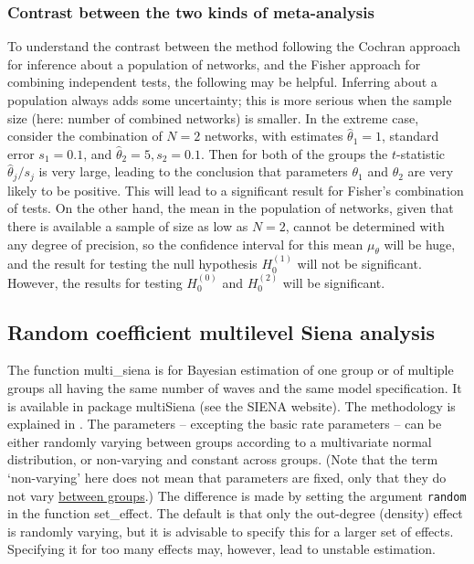 \documentclass[a4paper,fleqn,11pt]{article}
\newcommand{\+}{\, + \,}
\newcommand{\sfn}[1]{\textsf{#1}}
\newcommand{\SI}{{\sf SIENA }}
\newcommand{\MS}{{\sf multiSiena }}
\begin{document}
\subsubsection{Contrast between the two kinds of meta-analysis }

To understand the contrast between the method following the Cochran approach
for inference about a population of networks,
and the Fisher approach for combining independent tests, the following
may be helpful.
Inferring about a population always adds some uncertainty;
this is more serious when the sample size (here: number of combined networks)
is smaller.
In the extreme case, consider the combination of $N=2$ networks,
with estimates $\hat\theta_1 = 1$, standard error $s_1 = 0.1$,
and $\hat\theta_2 = 5, s_2 = 0.1$.
Then for both of the groups the $t$-statistic $\hat\theta_j/s_j$ is very large,
leading to the conclusion that parameters $\theta_1$ and $\theta_2$
are very likely to be positive.
This will lead to a significant result for Fisher's combination of tests.
On the other hand, the mean in the population of networks, given that
there is available a sample of size as low as $N=2$, cannot be determined with
any degree of precision, so the confidence interval for this mean $\mu_\theta$
will be huge, and the result for testing the null hypothesis
$H_0^{(1)}$ will not be significant.
However, the results for testing $H_0^{(0)}$ and $H_0^{(2)}$
will be significant.


\subsection{Random coefficient multilevel Siena analysis}
\label{S_multi_siena}

  The function \textsf{multi\_siena} is for Bayesian estimation of one group or
  of multiple groups all having the same number of waves and the same
  model specification.
  It is available in package \MS (see the \SI website).
  The methodology is explained in \citet{KoskinenSnijders2023}.
  The parameters -- excepting the basic rate parameters -- can be either
  randomly varying between groups according to a multivariate
  normal distribution, or non-varying and constant across groups.
  (Note that the term `non-varying' here does not mean that parameters
  are fixed, only that they do not vary \underline{between groups}.)
  The difference is made by setting the argument \texttt{random} in
  the function \sfn{set\_effect}. The default is that only the out-degree (density)
  effect is randomly varying, but it is advisable to specify
  this for a larger set of effects.
  Specifying it for too many effects may, however, lead to unstable estimation.
\end{document}
